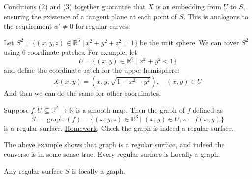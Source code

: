 \documentclass{article}
\begin{document}
\begin{remark}
    Conditions (2) and (3) together guarantee that $X$ is an embedding from $U$ to $S$, ensuring the existence of a tangent plane at each point of $S$. This is analogous to the requirement $\alpha' \neq 0$ for regular curves.
\end{remark}

\begin{example}
Let $S^2 = \{(x,y,z) \in \mathbb{R}^3 \mid x^2 + y^2 + z^2 = 1\}$ be the unit sphere. We can cover $S^2$ using 6 coordinate patches. For example, let
\[
U = \{(x,y) \in \mathbb{R}^2 \mid x^2 + y^2 < 1\}
\]
and define the coordinate patch for the upper hemisphere:
\[
X(x,y) = \left(x, y, \sqrt{1 - x^2 - y^2}\right), \quad (x,y) \in U
\]
And then we can do the same for other coordinates.
\end{example}

\begin{example}
    Suppose $f: U \subseteq \mathbb{R}^2 \rightarrow \mathbb{R}$ is a smooth map. Then the graph of $f$ defined as
\[
S = \operatorname{graph}(f) = \{(x, y, z) \in \mathbb{R}^3 \mid (x, y) \in U, z = f(x, y)\}
\]
is a regular surface.\newline
\noindent \underline{Homework}: Check the graph is indeed a regular surface.
\end{example}

The above example shows that graph is a regular surface, and indeed the converse is in some sense true. Every regular surface is Locally a graph.

\begin{proposition}
Any regular surface $S$ is locally a graph.
\end{proposition}
\end{document}
